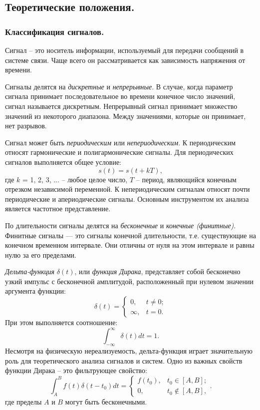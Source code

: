 \documentclass[a4paper,14pt]{extarticle}
\begin{document}
\subsection{Теоретические положения.}
\subsubsection{Классификация сигналов.}
Сигнал – это носитель информации, используемый для передачи сообщений в системе связи. Чаще всего он рассматривается как зависимость напряжения от времени.

Сигналы делятся на \textit{дискретные} и \textit{непрерывные}. В случае, когда параметр сигнала принимает последовательное во времени конечное число значений, сигнал называется дискретным. Непрерывный сигнал принимает множество значений из некоторого диапазона. Между значениями, которые он принимает, нет разрывов.

Сигнал может быть \textit{периодическим} или \textit{непериодическим}. К периодическим относят гармонические и полигармонические сигналы. Для периодических сигналов выполняется общее условие:
\begin{equation*}
s(t) = s(t + kT),
\end{equation*}
где $k$ = 1, 2, 3, ... -- любое целое число, $T$ -- период, являющийся конечным отрезком независимой переменной. К непериодическим сигналам относят почти периодические и апериодические сигналы. Основным инструментом их анализа является частотное представление.

По длительности сигналы делятся на \textit{бесконечные} и \textit{конечные (финитные)}. Финитные сигналы — это сигналы конечной длительности, т.е. существующие на конечном временном интервале. Они отличны от нуля на этом интервале и равны нулю за его пределами.

\textit{Дельта-функция} $\delta(t)$, или \textit{функция Дирака}, представляет собой бесконечно узкий импульс с бесконечной амплитудой, расположенный при
нулевом значении аргумента функции:
\begin{equation*}
\delta(t) = \begin{cases} 0, & t \neq 0; \\ \infty, & t = 0. \end{cases}
\end{equation*}
При этом выполняется соотношение:
\begin{equation*}
\int_{-\infty}^\infty \delta(t)dt = 1.
\end{equation*}
Несмотря на физическую нереализуемость, дельта-функция играет значительную роль для теоретического анализа сигналов и систем. Одно из важных свойств функции Дирака -- это фильтрующее свойство:
\begin{equation*}
\int_A^B f(t) \delta(t - t_0) dt = \begin{cases} f(t_0), & t_0 \in [A, B]; \\ 0, & t_0 \notin [A, B], \end{cases}.
\end{equation*}
где пределы $A$ и $B$ могут быть бесконечными.
\end{document}
